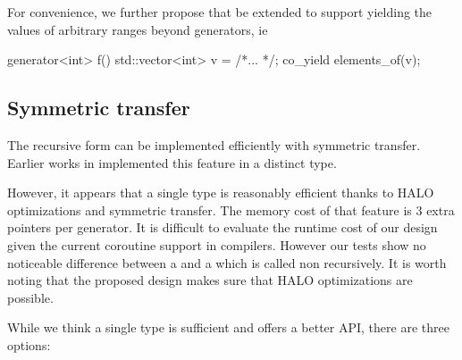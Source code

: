 \documentclass{wg21}
\begin{document}
For convenience, we further propose that  be extended to support
yielding the values of arbitrary ranges beyond generators, ie 

\begin{colorblock}
    generator<int> f()
    {
        std::vector<int> v = /*... */;
        co_yield elements_of(v);
    }
    
\end{colorblock}

\subsection{Symmetric transfer}

The recursive form can be implemented efficiently with symmetric transfer.
Earlier works in \cite{CppCoro} implemented this feature in a distinct  type.

However, it appears that a single type is reasonably efficient thanks to HALO optimizations and symmetric transfer.
The memory cost of that feature is 3 extra pointers per generator.
It is difficult to evaluate the runtime cost of our design given the current coroutine support in compilers.
However our tests show no noticeable difference between a  and a  
which is called non recursively. It is worth noting that the proposed design makes sure that HALO \cite{P0981R0} optimizations are possible.

While we think a single  type is sufficient and offers a better API, there are three options:
\end{document}
